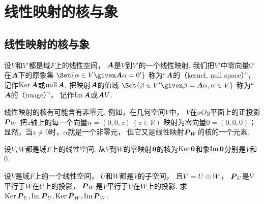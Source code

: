 \section{线性映射的核与象}
\subsection{线性映射的核与象}
\begin{definition}
设\(V\)和\(V'\)都是域\(F\)上的线性空间，
\(\boldsymbol{A}\)是\(V\)到\(V'\)的一个线性映射.
我们把\(V'\)中零向量\(0'\)在\(\boldsymbol{A}\)下的原象集
\(\Set{
	\alpha\in V
	\given
	\vb{A}\alpha=0'
}\)
称为“\(\boldsymbol{A}\)的（kernel, null space）”，
记作\(\operatorname{Ker}\boldsymbol{A}\)或\(\operatorname{null}\boldsymbol{A}\).
把映射\(\boldsymbol{A}\)的值域
\(\Set{
	\beta \in V'
	\given
	\beta = \vb{A}\alpha,
	\alpha \in V
}\)
称为“\(\boldsymbol{A}\)的（image）”，
记作\(\operatorname{Im}\boldsymbol{A}\)或\(\boldsymbol{A}V\).
\end{definition}
\begin{remark}
线性映射的核有可能含有非零元.
例如，在几何空间\(V\)中，
\(V\)在\(xOy\)平面上的正投影\(\boldsymbol{P}_W\)
把\(z\)轴上的每一个向量\(\alpha=(0,0,z)\ (z\in\mathbb{R})\)
映射为零向量\(0=(0,0,0)\)；
显然，当\(z\neq0\)时，\(\alpha\)就是一个非零元，
但它又是线性映射\(\boldsymbol{P}_W\)的核的一个元素.
\end{remark}

\begin{example}
设\(V,W\)都是域\(F\)上的线性空间.
从\(V\)到\(W\)的零映射\(\boldsymbol0\)的核为\(\operatorname{Ker}\boldsymbol0\)和象\(\operatorname{Im}\boldsymbol0\)分别是\(V\)和\(0\).
\end{example}

\begin{example}
设\(V\)是域\(F\)上的一个线性空间，
\(U\)和\(W\)都是\(V\)的子空间，
且\(V = U \oplus W\)，
\(\boldsymbol{P}_U\)是\(V\)平行于\(W\)在\(U\)上的投影，
\(\boldsymbol{P}_W\)是\(V\)平行于\(U\)在\(W\)上的投影.
求\(\operatorname{Ker}\boldsymbol{P}_U,
\operatorname{Im}\boldsymbol{P}_U,
\operatorname{Ker}\boldsymbol{P}_W,
\operatorname{Im}\boldsymbol{P}_W\).
\end{example}

